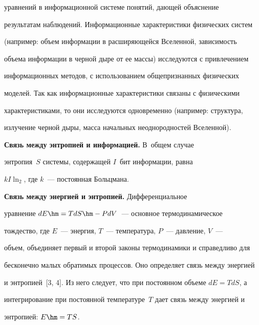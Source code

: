 уравнений в информационной системе понятий, дающей объяснение 


результатам наблюдений. Информационные характеристики физических систем 


(например: объем информации в расширяющейся Вселенной, зависимость 


объема информации в черной дыре от ее массы) исследуются с привлечением 


информационных методов, с использованием общепризнанных физических 


моделей. Так как информационные характеристики связаны с физическими 


характеристиками, то они исследуются одновременно (например: структура, 


излучение черной дыры, масса начальных неоднородностей Вселенной).


   


   \smallskip


   


   \textbf{Связь между энтропией и информацией.} В~общем случае 


энтропия~$S$ сис\-те\-мы, содержащей $I$~бит информации, равна 


$kI\ln_2$, где $k$~--- постоянная Больцмана.


   


   \smallskip


   


   \textbf{Связь между энергией и энтропией.} Дифференциальное 


уравнение $dE \hm= TdS \hm- PdV$~--- основное термодинамическое 


тождество, где $E$~--- энергия, $T$~--- температура, $P$~--- давление, $V$~--- 


объем, объединяет первый и второй законы термодинамики и справедливо для 


бесконечно малых обратимых процессов. Оно определяет связь между энергией 


и энтропией~[3, 4]. Из него следует, что при постоянном объеме $dE = TdS$, а 


интегрирование при постоянной температуре~$T$ дает связь между энергией и 


энтропией: $E \hm= TS$. 


     



